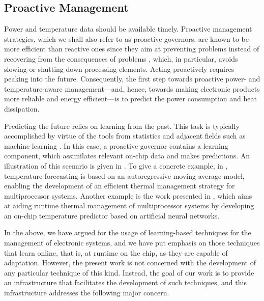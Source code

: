 \subsection{Proactive Management}

Power and temperature data should be available timely. Proactive management
strategies, which we shall also refer to as proactive governors, are known to be
more efficient than reactive ones since they aim at preventing problems instead
of recovering from the consequences of problems \cite{coskun2008, chaudhry2015},
which, in particular, avoids slowing or shutting down processing elements.
Acting proactively requires peaking into the future. Consequently, the first
step towards proactive power- and temperature-aware management---and, hence,
towards making electronic products more reliable and energy efficient---is to
predict the power consumption and heat dissipation.

Predicting the future relies on learning from the past. This task is typically
accomplished by virtue of the tools from statistics and adjacent fields such as
machine learning \cite{bishop2006}. In this case, a proactive governor contains
a learning component, which assimilates relevant on-chip data and makes
predictions. An illustration of this scenario is given in . To
give a concrete example, in \cite{coskun2008}, temperature forecasting is based
on an autoregressive moving-average model, enabling the development of an
efficient thermal management strategy for multiprocessor systems. Another
example is the work presented in \cite{kumar2010}, which aims at aiding runtime
thermal management of multiprocessor systems by developing an on-chip
temperature predictor based on artificial neural networks.

In the above, we have argued for the usage of learning-based techniques for the
management of electronic systems, and we have put emphasis on those techniques
that learn online, that is, at runtime on the chip, as they are capable of
adaptation. However, the present work is not concerned with the development of
any particular technique of this kind. Instead, the goal of our work is to
provide an infrastructure that facilitates the development of such techniques,
and this infrastructure addresses the following major concern.

